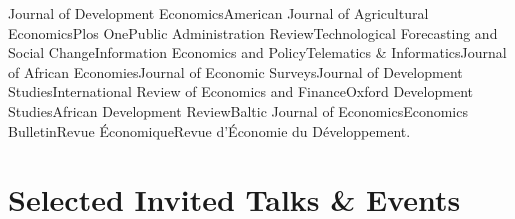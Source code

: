 \documentclass[11pt, a4paper]{article}
\begin{document}
{\RaggedRight\noindent Journal of Development Economics\hspace{0.3em}\textbullet\hspace{0.3em}American Journal of Agricultural Economics\hspace{0.3em}\textbullet\hspace{0.3em}Plos One\hspace{0.3em}\textbullet\hspace{0.3em}Public Administration Review\hspace{0.3em}\textbullet\hspace{0.3em}Technological Forecasting and Social Change\hspace{0.3em}\textbullet\hspace{0.3em}Information Economics and Policy\hspace{0.3em}\textbullet\hspace{0.3em}Telematics \& Informatics\hspace{0.3em}\textbullet\hspace{0.3em}Journal of African Economies\hspace{0.3em}\textbullet\hspace{0.3em}Journal of Economic Surveys\hspace{0.3em}\textbullet\hspace{0.3em}Journal of Development Studies\hspace{0.3em}\textbullet\hspace{0.3em}International Review of Economics and Finance\hspace{0.3em}\textbullet\hspace{0.3em}Oxford Development Studies\hspace{0.3em}\textbullet\hspace{0.3em}African Development Review\hspace{0.3em}\textbullet\hspace{0.3em}Baltic Journal of Economics\hspace{0.3em}\textbullet\hspace{0.3em}Economics Bulletin\hspace{0.3em}\textbullet\hspace{0.3em}Revue \'{E}conomique\hspace{0.3em}\textbullet\hspace{0.3em}Revue d'\'{E}conomie du D\'{e}veloppement.\par}

\section{Selected Invited Talks \& Events}
\end{document}
